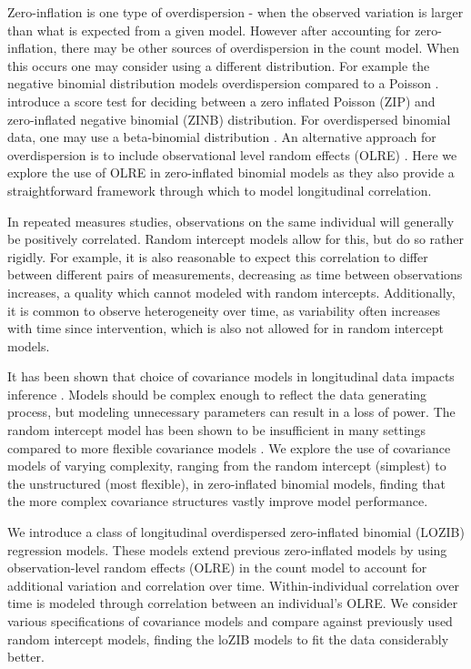 \documentclass[12pt]{article}
\begin{document}
Zero-inflation is one type of overdispersion - when the observed variation is larger than what is expected from a given model. However after accounting for zero-inflation, there may be other sources of overdispersion in the count model. When this occurs one may consider using a different distribution. For example the negative binomial distribution models overdispersion compared to a Poisson \citep{gardner1995regression}. \cite{hinde1998overdispersion} introduce a score test for deciding between a zero inflated Poisson (ZIP) and zero-inflated negative binomial (ZINB) distribution. For overdispersed binomial data, one may use a beta-binomial distribution \cite{hu2018zero, wen2024bayesian}. An alternative approach for overdispersion is to include observational level random effects (OLRE)  \cite{harrison2014using}. Here we explore the use of OLRE in zero-inflated binomial models as they also provide a straightforward framework through which to model longitudinal correlation.

In repeated measures studies, observations on the same individual will generally be positively correlated. Random intercept models allow for this, but do so rather rigidly. For example, it is also reasonable to expect this correlation to differ between different pairs of measurements, decreasing as time between observations increases, a quality which cannot modeled with random intercepts. Additionally, it is common to observe heterogeneity over time, as variability often increases with time since intervention, which is also not allowed for in random intercept models.

It has been shown that choice of covariance models in longitudinal data impacts inference \citep{lange1989effect, wolfinger1996heterogeneous}. Models should be complex enough to reflect the data generating process, but modeling unnecessary parameters can result in a loss of power. The random intercept model has been shown to be insufficient in many settings compared to more flexible covariance models \citep{barr2013random, kwok2007impact}.  We explore the use of covariance models of varying complexity, ranging from the random intercept (simplest) to the unstructured (most flexible), in zero-inflated binomial models, finding that the more complex covariance structures vastly improve model performance.

We introduce a class of longitudinal overdispersed zero-inflated binomial (LOZIB) regression models. These models extend previous zero-inflated models by using observation-level random effects (OLRE) in the count model to account for additional variation and correlation over time.  Within-individual correlation over time is modeled through correlation between an individual's OLRE. We consider various specifications of covariance models and compare against previously used random intercept models, finding the loZIB models to fit the data considerably better.
\end{document}
